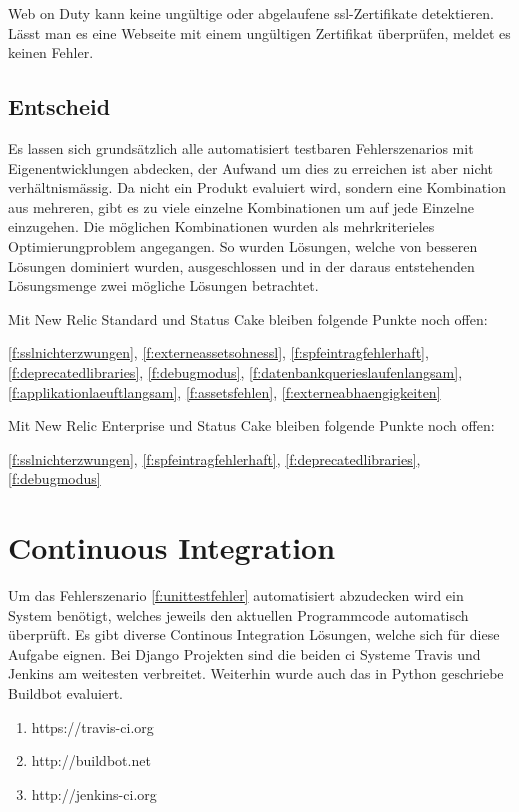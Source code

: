 Web on Duty kann keine ungültige oder abgelaufene \acrshort{ssl}-Zertifikate detektieren. Lässt man es eine Webseite mit einem ungültigen Zertifikat überprüfen, meldet es keinen Fehler.

\subsection{Entscheid}
\label{sub:entscheid_monitoring}
Es lassen sich grundsätzlich alle automatisiert testbaren Fehlerszenarios mit Eigenentwicklungen abdecken, der Aufwand um dies zu erreichen ist aber nicht verhältnismässig. Da nicht ein Produkt evaluiert wird, sondern eine Kombination aus mehreren, gibt es zu viele einzelne Kombinationen um auf jede Einzelne einzugehen. Die möglichen Kombinationen wurden als mehrkriterieles Optimierungproblem angegangen. So wurden Lösungen, welche von besseren Lösungen dominiert wurden, ausgeschlossen und in der daraus entstehenden Lösungsmenge zwei mögliche Lösungen betrachtet.


Mit New Relic Standard und Status Cake bleiben folgende Punkte noch offen:

\ref{f:sslnichterzwungen}, \ref{f:externeassetsohnessl}, \ref{f:spfeintragfehlerhaft}, \ref{f:deprecatedlibraries}, \ref{f:debugmodus}, \ref{f:datenbankquerieslaufenlangsam}, \ref{f:applikationlaeuftlangsam}, \ref{f:assetsfehlen}, \ref{f:externeabhaengigkeiten}

Mit New Relic Enterprise und Status Cake bleiben folgende Punkte noch offen:

\ref{f:sslnichterzwungen}, \ref{f:spfeintragfehlerhaft}, \ref{f:deprecatedlibraries}, \ref{f:debugmodus}

\section{Continuous Integration}
\label{sec:continuous_integration_evaluation}
Um das Fehlerszenario \ref{f:unittestfehler} automatisiert abzudecken wird ein System benötigt, welches jeweils den aktuellen Programmcode automatisch überprüft. Es gibt diverse Continous Integration Lösungen, welche sich für diese Aufgabe eignen. Bei Django Projekten sind die beiden \acrshort{ci} Systeme Travis und Jenkins am weitesten verbreitet. Weiterhin wurde auch das in Python geschriebe Buildbot evaluiert.

\begin{enumerate}
  \item https://travis-ci.org
  \item http://buildbot.net
  \item http://jenkins-ci.org
\end{enumerate}

